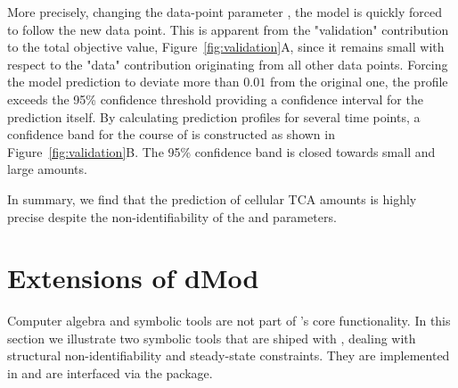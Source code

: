 \documentclass[article]{jss}
\begin{document}
More precisely, changing the data-point parameter , the model is quickly forced to
follow the new data point. This is apparent from the "validation" contribution
to the total objective value, Figure~\ref{fig:validation}A, since it remains small with respect to the "data"
contribution originating from all other data points. Forcing the model
prediction to deviate more than $0.01$ from the original one, the profile
exceeds the 95\% confidence threshold providing a confidence interval for the
prediction itself. By calculating
prediction profiles for several time points, a confidence band for the course of
 is constructed as shown in Figure~\ref{fig:validation}B. The
95\% confidence band is closed towards small and large amounts.

In summary, we find that the prediction of cellular TCA amounts is highly
precise despite the non-identifiability of the  and
 parameters.

\section{Extensions of dMod}
\label{sec:extensions}
Computer algebra and symbolic tools are not part of 's core functionality. In this section we illustrate two symbolic tools that are shiped with ,  dealing with structural non-identifiability and steady-state constraints. They are implemented in  and are interfaced via the  package.
\end{document}
